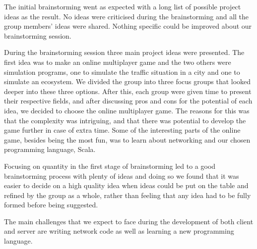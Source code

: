 \documentclass[a4paper]{article}
\begin{document}
The initial brainstorming went as expected with a long list of possible project ideas as the result. No ideas were criticised during the brainstorming and all the group members' 
ideas were shared. Nothing specific could be improved about our brainstorming session. 

During the brainstorming session three main project ideas were presented. The first idea was to make an online multiplayer game and the two others were simulation programs, 
one to simulate the traffic situation in a city and one to simulate an ecosystem. We divided the group into three focus groups that looked deeper into these three options. 
After this, each group were given time to present their respective fields, and after discussing pros and cons for the potential of each idea, we decided to choose the online 
multiplayer game. The reasons for this was that the complexity was intriguing, and that there was potential to develop the game further in case of extra time. Some of the 
interesting parts of the online game, besides being the most fun, was to learn about networking and our chosen programming language, Scala. 

Focusing on quantity in the first stage of brainstorming led to a good brainstorming process with plenty of ideas and doing so we found that it was easier to decide on a high 
quality idea when ideas could be put on the table and refined by the group as a whole, rather than feeling that any idea had to be fully formed before being suggested.

The main challenges that we expect to face during the development of both client and server are writing network code as well as learning a new programming language.
\newpage
\end{document}
